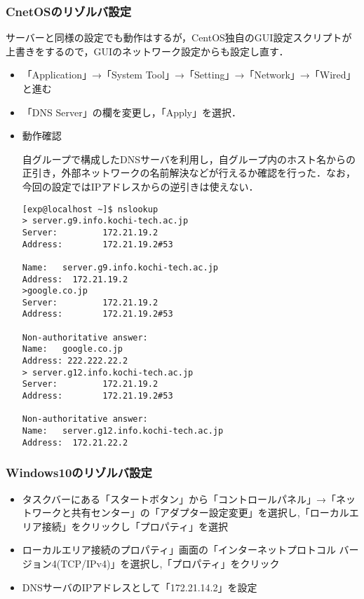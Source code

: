 \documentclass[a4j,titlepage]{jarticle}
\begin{document}
\subsubsection{CnetOSのリゾルバ設定}
サーバーと同様の設定でも動作はするが，CentOS独自のGUI設定スクリプトが上書きをするので，GUIのネットワーク設定からも設定し直す．
\begin{itemize}

\item 「Application」→「System Tool」→「Setting」→「Network」→「Wired」と進む

\item 「DNS Server」の欄を変更し，「Apply」を選択．

\item 動作確認

自グループで構成したDNSサーバを利用し，自グループ内のホスト名からの正引き，外部ネットワークの名前解決などが行えるか確認を行った．なお，今回の設定ではIPアドレスからの逆引きは使えない．

\begin{center}
    \begin{screen}
    \begin{verbatim}
[exp@localhost ~]$ nslookup
> server.g9.info.kochi-tech.ac.jp
Server:         172.21.19.2
Address:        172.21.19.2#53

Name:   server.g9.info.kochi-tech.ac.jp
Address:  172.21.19.2  
>google.co.jp
Server:         172.21.19.2
Address:        172.21.19.2#53

Non-authoritative answer:
Name:   google.co.jp
Address: 222.222.22.2
> server.g12.info.kochi-tech.ac.jp
Server:         172.21.19.2
Address:        172.21.19.2#53

Non-authoritative answer:
Name:   server.g12.info.kochi-tech.ac.jp
Address:  172.21.22.2  
  \end{verbatim}
    \end{screen}
  \end{center}

\end{itemize}

\subsubsection{Windows10のリゾルバ設定}
\begin{itemize}
\item タスクバーにある「スタートボタン」から「コントロールパネル」→「ネットワークと共有センター」の「アダプター設定変更」を選択し,「ローカルエリア接続」をクリックし「プロパティ」を選択
\item ローカルエリア接続のプロパティ」画面の「インターネットプロトコル バージョン4(TCP/IPv4)」を選択し,「プロパティ」をクリック
\item DNSサーバのIPアドレスとして「172.21.14.2」を設定
\end{itemize}
\end{document}
